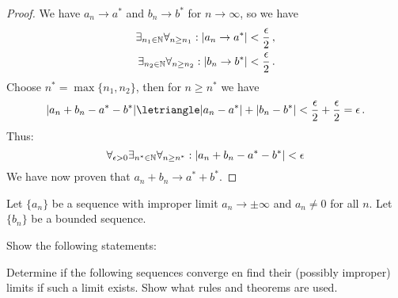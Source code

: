 \documentclass[week=3]{homework}
\begin{document}
\begin{questions}
\begin{parts}
\begin{proof}
	        	We have $a_n \to a^*$ and $b_n \to b^*$ for $n\to\infty$, so we have
		        \begin{align*}
		        	\exists_{n_1 \in\naturals}\forall_{n \geq n_1}: |a_n \to a^*| &< \frac{\epsilon}{2}\,, \\
		        	\exists_{n_2 \in\naturals}\forall_{n \geq n_2}: |b_n \to b^*| &< \frac{\epsilon}{2}\,.
	        	\end{align*}
	        	Choose $n^* = \max\{n_1,n_2\}$, then for $n \geq n^*$ we have
	        	\[
		        	|a_n + b_n - a^* - b^*| \letriangle |a_n - a^*| + |b_n - b^*| < \frac{\epsilon}{2} + \frac{\epsilon}{2} = \epsilon\,.
	        	\]
	        	Thus:
	        	\[
		        	\forall_{\epsilon > 0}\exists_{n^*\in\naturals}\forall_{n\geq n^*}: |a_n + b_n - a^* - b^*| < \epsilon
	        	\]
	        	We have now proven that $a_n + b_n \to a^* + b^*$.
	        \end{proof}
        \end{parts}
    
	    \question
	    Let $\{a_n\}$ be a sequence with improper limit $a_n \to \pm\infty$ and $a_n \neq 0$ for all $n$. Let $\{b_n\}$ be a bounded sequence.
	    
	    Show the following statements:
    
	    \question
	    Determine if the following sequences converge en find their (possibly improper) limits if such a limit exists. Show what rules and theorems are used.
	    

\end{questions}
\end{document}
